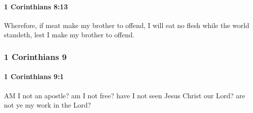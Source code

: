 		\paragraph{1 Corinthians 8:13} %
			\label{1CORINTHIANS-8-13}

			Wherefore, if meat make my brother to offend, I will eat no flesh while the world standeth, lest I make my brother to offend.

			\begin{framed}
			\scriptsize
				\begin{compactdesc}
					\item[SBLG] 
				\end{compactdesc}
			\end{framed}

	\subsubsection{1 Corinthians 9} %
		\label{1CORINTHIANS-9}
		
		\paragraph{1 Corinthians 9:1} %
			\label{1CORINTHIANS-9-1}

			AM I not an apostle?  am I not free?  have I not seen Jesus Christ our Lord?  are not ye my work in the Lord?

